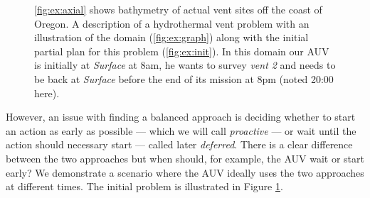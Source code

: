 \begin{figure}[!htb]
  \hfill {}
  \caption{\small{\ref{fig:ex:axial} shows bathymetry of actual vent
      sites off the coast of Oregon. A description of a hydrothermal
      vent problem with an illustration of the domain
      (\ref{fig:ex:graph}) along with the initial partial plan for
      this problem (\ref{fig:ex:init}). In this domain our AUV is
      initially at {\em Surface} at 8am, he wants to survey {\em vent
        2} and needs to be back at {\em
        Surface} before the end of its mission at 8pm (noted 20:00
      here).}}
\label{fig:Example}
\end{figure}

However, an issue with finding a balanced approach is deciding whether
to start an action as early as possible --- which we will call {\em
proactive} --- or wait until the action should necessary start ---
called later {\em deferred}.  There is a clear difference between the
two approaches but when should, for example, the AUV wait or start
early? We demonstrate a scenario where the AUV ideally uses the two
approaches at different times. The initial problem is illustrated in Figure
\ref{fig:Example}.

